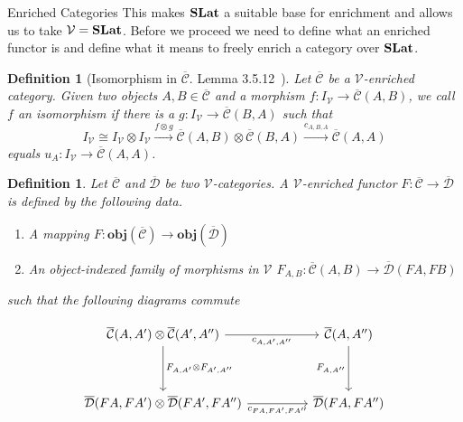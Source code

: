 \documentclass[acmsmall, screen, nonacm]{acmart}
\newcommand\obj[1]{{\textbf{obj}(#1)}}
\newtheorem{definition}[theorem]{Definition}
\newcommand\enriched[1]{{\overline{\mathcal{#1}}}}
\begin{document}
\begin{section}{Enriched Categories}
This makes $\mathbf{SLat}$ a suitable base for enrichment and allows us to take $\mathcal{V} = \mathbf{SLat}$.
Before we proceed we need to define what an enriched functor is and define what it means to freely enrich a category over $\mathbf{SLat}$.

\begin{definition}[Isomorphism in $\enriched{C}$. Lemma 3.5.12~\cite{Riehl_2014}]

Let $\enriched{C}$ be a $\mathcal{V}$-enriched category.
Given two objects $A,B \in \enriched{C}$ and a morphism $f : I_{\mathcal{V}} \to \enriched{C}(A,B)$, we call $f$ an isomorphism if there is a $g : I_{\mathcal{V}} \to \enriched{C}(B,A)$ such that
\[
  I_{\mathcal{V}} \cong I_{\mathcal{V}} \otimes I_{\mathcal{V}} \xrightarrow{f \otimes g} \enriched{C}(A,B) \otimes \enriched{C}(B,A) \xrightarrow{c_{A,B,A}} \enriched{C}(A,A)
\]
equals $u_{A} : I_{\mathcal{V}} \to \enriched{C}(A,A)$.
\end{definition}


\begin{definition}
  Let $\enriched{C}$ and $\enriched{D}$ be two $\mathcal{V}$-categories.
  A $\mathcal{V}$-enriched functor $F : \enriched{C} \to \enriched{D}$ is defined by the following data.
  \begin{enumerate}
    \item A mapping $F : \obj{\enriched{C}} \to \obj{\enriched{D}}$
    \item An object-indexed family of morphisms in $\mathcal{V}$ $F_{A,B} : \enriched{C}(A,B) \to \enriched{D}(FA,FB)$
  \end{enumerate}
  such that the following diagrams commute

  \[
  \begin{tikzcd}
	{\enriched{C}(A,A') \otimes \enriched{C}(A',A'')} && {\enriched{C}(A,A'')} \\
	\\
	{\enriched{D}(FA,FA') \otimes \enriched{D}(FA',FA'')} && {\enriched{D}(FA,FA'')}
	\arrow["{c_{A,A',A''}}"', from=1-1, to=1-3]
	\arrow["{F_{A,A'} \otimes F_{A',A''}}", from=1-1, to=3-1]
	\arrow["{F_{A,A''}}"', from=1-3, to=3-3]
	\arrow["{c_{FA,FA',FA''}}"', from=3-1, to=3-3]
\end{tikzcd}
\]


\end{definition}
\end{section}
\end{document}

